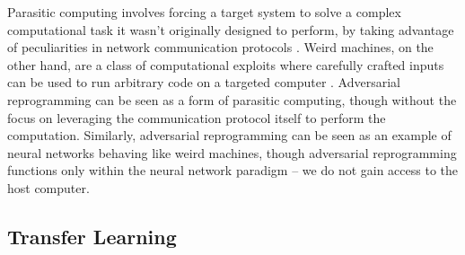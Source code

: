 \documentclass{article}
\begin{document}

Parasitic computing involves 
forcing a target system to solve a complex computational task it wasn't originally designed to perform, 
by taking advantage of peculiarities in network communication protocols \citep{barabasi2001parasitic,peresini2013network}. 
Weird machines, on the other hand, are a class of computational exploits where carefully crafted inputs can be used to run arbitrary code on a targeted computer \citep{bratus2011exploit}. 
Adversarial reprogramming can be seen as a form of parasitic computing, though without the focus on leveraging the communication protocol itself to perform the computation. 
Similarly, adversarial reprogramming can be seen as an example of neural networks behaving like weird machines, 
though adversarial reprogramming functions only within the neural network paradigm -- we do not gain 
access to the host computer.

\subsection{Transfer Learning}
\end{document}
